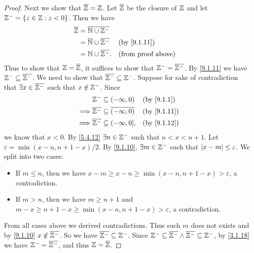 \begin{proof}
  Next we show that \(\overline{\mathbb{Z}} = \mathbb{Z}\).
  Let \(\overline{\mathbb{Z}}\) be the closure of \(\mathbb{Z}\) and let \(\mathbb{Z}^- = \{z \in \mathbb{Z} : z < 0\}\).
  Then we have
  \begin{align*}
    \overline{\Z} & = \overline{\N \cup \Z^-}                                           \\
                  & = \overline{\N} \cup \overline{\Z^-} &  & \by{9.1.11}               \\
                  & = \N \cup \overline{\Z^-}.           &  & \text{(from proof above)}
  \end{align*}
  Thus to show that \(\mathbb{Z} = \overline{\mathbb{Z}}\), it suffices to show that \(\mathbb{Z}^- = \overline{\mathbb{Z}^-}\).
  By \cref{9.1.11} we have \(\mathbb{Z}^- \subseteq \overline{\mathbb{Z}^-}\).
  We need to show that \(\overline{\mathbb{Z}^-} \subseteq \mathbb{Z}^-\).
  Suppose for sake of contradiction that \(\exists x \in \overline{\mathbb{Z}^-}\) such that \(x \notin \mathbb{Z}^-\).
  Since
  \begin{align*}
             & \Z^- \subseteq (-\infty, 0)                       &  & \by{9.1.1}  \\
    \implies & \overline{\Z^-} \subseteq \overline{(-\infty, 0)} &  & \by{9.1.11} \\
    \implies & \overline{\Z^-} \subseteq (-\infty, 0],           &  & \by{9.1.12}
  \end{align*}
  we know that \(x < 0\).
  By \cref{5.4.12} \(\exists n \in \mathbb{Z}^-\) such that \(n < x < n + 1\).
  Let \(\varepsilon = \min(x - n, n + 1 - x) / 2\).
  By \cref{9.1.10}, \(\exists m \in \mathbb{Z}^-\) such that \(\left\lvert x - m\right\rvert \leq \varepsilon\).
  We split into two cases:
  \begin{itemize}
    \item If \(m \leq n\), then we have \(x - m \geq x - n \geq \min(x - n, n + 1 - x) > \varepsilon\), a contradiction.
    \item If \(m > n\), then we have \(m \geq n + 1\) and \(m - x \geq n + 1 - x \geq \min(x - n, n + 1 - x) > \varepsilon\), a contradiction.
  \end{itemize}
  From all cases above we derived contradictions.
  Thus such \(m\) does not exists and by \cref{9.1.10} \(x \notin \overline{\mathbb{Z}^-}\).
  So we have \(\overline{\mathbb{Z}^-} \subseteq \mathbb{Z}^-\).
  Since \(\mathbb{Z}^- \subseteq \overline{\mathbb{Z}^-} \land \overline{\mathbb{Z}^-} \subseteq \mathbb{Z}^-\), by \cref{3.1.18} we have \(\mathbb{Z}^- = \overline{\mathbb{Z}^-}\), and thus \(\mathbb{Z} = \overline{\mathbb{Z}}\).


\end{proof}
